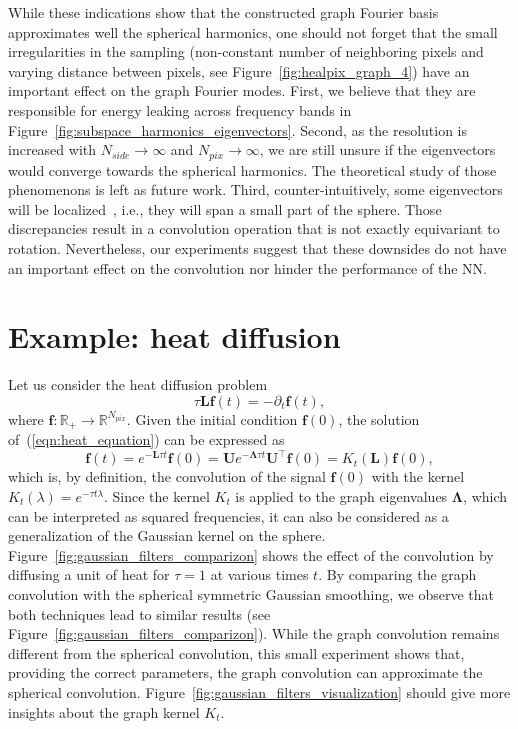\documentclass[final,twocolumn,3p,times,sort&compress]{elsarticle}
\newcommand{\figref}[1]{Figure~\ref{fig:#1}}
\newcommand{\eqnref}[1]{(\ref{eqn:#1})}
\renewcommand{\b}[1]{{\bm{#1}}}   %
\newcommand{\1}{\b{1}}              %
\newcommand{\0}{\b{0}}              %
\newcommand{\g}[1]{\b{#1}}
\renewcommand{\L}{\b{L}}
\newcommand{\U}{\b{U}}
\newcommand{\trans}{^\intercal}
\newcommand{\R}{\mathbb{R}}
\newcommand{\bLambda}{\b{\Lambda}}
\begin{document}
While these indications show that the constructed graph Fourier basis approximates well the spherical harmonics, one should not forget that the small irregularities in the sampling (non-constant number of neighboring pixels and varying distance between pixels, see \figref{healpix_graph_4}) have an important effect on the graph Fourier modes.
First, we believe that they are responsible for energy leaking across frequency bands in \figref{subspace_harmonics_eigenvectors}.
Second, as the resolution is increased with $N_{side} \rightarrow \infty$ and $N_{pix} \rightarrow \infty$, we are still unsure if the eigenvectors would converge towards the spherical harmonics.
The theoretical study of those phenomenons is left as future work.
Third, counter-intuitively, some eigenvectors will be localized~\citep{perraudin2018global}, i.e., they will span a small part of the sphere.
Those discrepancies result in a convolution operation that is not exactly equivariant to rotation.
Nevertheless, our experiments suggest that these downsides do not have an important effect on the convolution nor hinder the performance of the NN.

\section{Example: heat diffusion}
\label{sec:heat_diffusion}
\label{sec:filter_visualization}

Let us consider the heat diffusion problem
\begin{equation}
  \tau \L \b{f}(t) = - \partial_t \b{f}(t),
  \label{eqn:heat_equation}
\end{equation}
where $\b{f}: \R_+ \rightarrow \R^{N_{pix}}$. Given the initial condition
$\b{f}(0)$, the solution of~\eqnref{heat_equation} can be expressed as
\begin{equation*}
  \b{f}(t) = e^{-\L \tau t} \b{f}(0) = \U e^{-\bLambda \tau t} \U\trans \g{f}(0) = K_t(\L) \b{f}(0),
\end{equation*}
which is, by definition, the convolution of the signal $\b{f}(0)$ with the kernel $K_t(\lambda)=e^{-\tau t \lambda}$. Since the kernel $K_t$ is applied to the graph eigenvalues $\bLambda$, which can be interpreted as squared frequencies, it can also be considered as a generalization of the Gaussian kernel on the sphere. \figref{gaussian_filters_comparizon} shows the effect of the convolution by diffusing a unit of heat for $\tau=1$ at various times $t$. By comparing the graph convolution with the spherical symmetric Gaussian smoothing, we observe that both techniques lead to similar results (see \figref{gaussian_filters_comparizon}). While the graph convolution remains different from the spherical convolution, this small experiment shows that, providing the correct parameters, the graph convolution can approximate the spherical convolution.
\figref{gaussian_filters_visualization} should give more insights about the graph kernel $K_t$.
\end{document}
